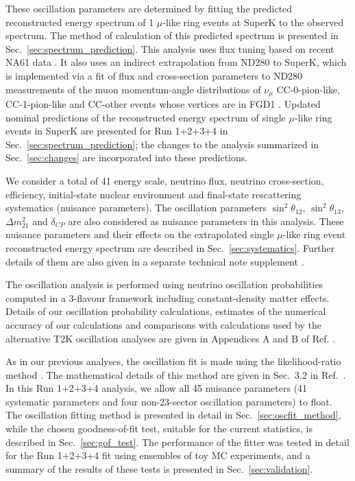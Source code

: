 These oscillation parameters are determined
by fitting the predicted reconstructed energy spectrum
of 1 $\mu$-like ring events at SuperK to the observed spectrum.
The method of calculation of this predicted spectrum is presented in Sec.\ \ref{sec:spectrum_prediction}.
This analysis uses flux tuning based on recent NA61 data \cite{FluxTuning}\cite{NA61T2K}. 
It also uses an indirect extrapolation from ND280 to SuperK, which is implemented via a fit of flux and cross-section parameters to
ND280 measurements of the muon momentum-angle distributions of $\nu_\mu$
CC-0-pion-like, CC-1-pion-like and CC-other events whose 
vertices are in FGD1 \cite{BANFF2013}.
Updated nominal predictions of the reconstructed energy spectrum of single $\mu$-like ring events in SuperK are presented for Run 1+2+3+4
in Sec.\ \ref{sec:spectrum_prediction}; the changes to the analysis summarized in Sec.\ \ref{sec:changes} are incorporated 
into these predictions. 

We consider a total of 41 energy scale, neutrino flux, neutrino cross-section,
efficiency, initial-state nuclear environment and final-state rescattering systematics (nuisance parameters).
The oscillation parameters $\sin^{2}\theta_{12}$, $\sin^{2}\theta_{13}$, $\Delta m^{2}_{21}$ and $\delta_{CP}$ are also considered 
as nuisance parameters in this analysis. These nuisance parameters and their effects 
on the extrapolated single $\mu$-like ring event reconstructed energy spectrum are described in Sec.\ \ref{sec:systematics}.
Further details of them are also given in a separate technical note
supplement \cite{OurRun1234DisappAnalysisSupplement}.

The oscillation analysis is performed using neutrino oscillation probabilities computed in a 3-flavour
framework including constant-density matter effects. 
Details of our oscillation probability calculations, estimates of the numerical accuracy of our
calculations and comparisons with calculations used by the alternative T2K oscillation analyses 
are given in Appendices A and B of Ref. \cite{OurRun123DisappAnalysis3Flavour}.

As in our previous analyses, the oscillation fit is made using the likelihood-ratio method \cite{StatAnalysisCowan}.
The mathematical details of this method are given in Sec.\ 3.2 in Ref.\ \cite{OurRun1DisappAnalysis}.
In this Run 1+2+3+4 analysis, we allow all 45 nuisance parameters (41 systematic parameters 
and four non-23-sector oscillation parameters) to float.
The oscillation fitting method is presented in detail in Sec.\ \ref{sec:oscfit_method},
while the chosen goodness-of-fit test, suitable for the current statistics, is described in Sec.\ \ref{sec:gof_test}.
The performance of the fitter was tested in detail for the Run 1+2+3+4 fit using ensembles of toy MC experiments, and
a summary of the results of these tests is presented in Sec.\ \ref{sec:validation}.

